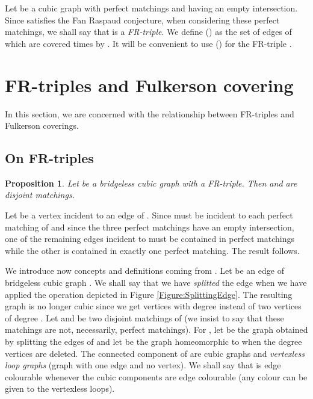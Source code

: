\documentclass{amsart}
\newtheorem{prop}[thm]{Proposition}
\theoremstyle{definition}
\theoremstyle{remark}
\newenvironment{prf}{{\bf \noindent Proof } }{\hfill\\}
\begin{document}
Let  be a cubic graph with  perfect matchings 
and  having an empty intersection. Since  satisfies the
Fan Raspaud conjecture, when considering these perfect matchings,
we shall say that  is a {\em
FR-triple}. We define  () as the set of
edges of  which are covered  times by . It will be
convenient to use () for the FR-triple .

\section{FR-triples and Fulkerson covering}


 In
this section, we are concerned with the relationship between
FR-triples and Fulkerson coverings.

\subsection{On FR-triples}

\begin{prop} \label{Proposition:StructureFR}
Let  be a bridgeless cubic graph with  a FR-triple.
Then  and  are disjoint matchings.
\end{prop}
\begin{prf}
Let  be a vertex incident to an edge of . Since  must
be incident to each perfect matching of  and since the
three perfect matchings have an empty intersection, one of the
remaining edges incident to  must be contained in  perfect
matchings while the other is contained in exactly one perfect
matching. The result follows.
\end{prf}


We introduce now  concepts and definitions coming from
\cite{HaoNiuWanZhaZha2009}. Let  be an edge of bridgeless cubic
graph . We shall say that we have {\em splitted} the edge 
when we have applied the operation depicted in Figure
\ref{Figure:SplittingEdge}. The resulting graph is no longer cubic
since we get  vertices with degree  instead of two vertices of
degree . Let  and  be two disjoint matchings of 
(we insist to say that these matchings are not, necessarily, perfect
matchings).  For , let  be the graph obtained by
splitting the edges of  and let  be the
graph homeomorphic to  when the degree  vertices are
deleted. The connected component of  are cubic
graphs and {\em vertexless loop graphs} (graph with one edge and no
vertex). We shall say that   is edge
colourable whenever the cubic components are edge colourable
(any colour can be given to the vertexless loops).
\end{document}
